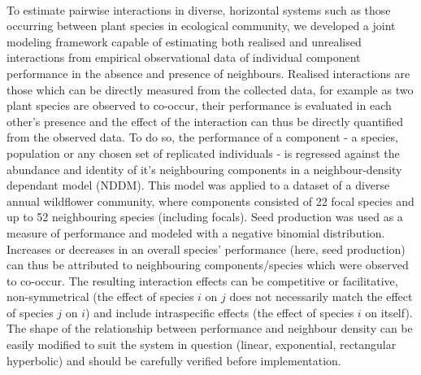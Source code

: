 \documentclass[a4,12pt]{article}
\begin{document}
    \paragraph{}
        To estimate pairwise interactions in diverse, horizontal systems such as those occurring between plant species in ecological community, we developed a joint modeling framework capable of estimating both realised and unrealised interactions from empirical observational data of individual component performance in the absence and presence of neighbours. Realised interactions are those which can be directly measured from the collected data, for example as two plant species are observed to co-occur, their performance is evaluated in each other's presence and the effect of the interaction can thus be directly quantified from the observed data. To do so, the performance of a component - a species, population or any chosen set of replicated individuals - is regressed against the abundance and identity of it's neighbouring components in a neighbour-density dependant model (NDDM). This model was applied to a dataset of a diverse annual wildflower community, where components consisted of 22 focal species and up to 52 neighbouring species (including focals). Seed production was used as a measure of performance and modeled with a negative binomial distribution. Increases or decreases in an overall species' performance (here, seed production) can thus be attributed to neighbouring components/species which were observed to co-occur. The resulting interaction effects can be competitive or facilitative, non-symmetrical (the effect of species $i$ on $j$ does not necessarily match the effect of species $j$ on $i$) and include intraspecific effects (the effect of species $i$ on itself). The shape of the relationship between performance and neighbour density can be easily modified to suit the system in question (linear, exponential, rectangular hyperbolic) and should be carefully verified before implementation. 
\end{document}
